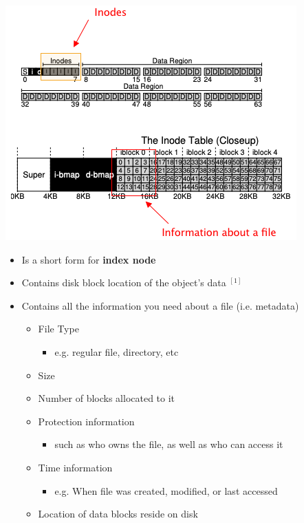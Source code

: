 \documentclass[12pt]{article}
\begin{document}
\begin{enumerate}[1.]
\begin{enumerate}[a)]
\begin{itemize}
            \begin{center}
            \includegraphics[width=\linewidth]{images/midterm_1_solution_12.png}
            \end{center}

            \begin{itemize}
                \item Is a short form for \textbf{index node}
                \item Contains disk block location of the object's data $^{[1]}$
                \item Contains all the information you need about a file (i.e. metadata)

                \begin{itemize}
                    \item File Type
                    \begin{itemize}
                        \item e.g. regular file, directory, etc
                    \end{itemize}
                    \item Size
                    \item Number of blocks allocated to it
                    \item Protection information
                    \begin{itemize}
                        \item such as who owns the file, as well as who can access it
                    \end{itemize}
                    \item Time information
                    \begin{itemize}
                        \item e.g. When file was created, modified, or last accessed
                    \end{itemize}
                    \item Location of data blocks reside on disk
                \end{itemize}
            \end{itemize}


\end{itemize}
\end{enumerate}
\end{enumerate}
\end{document}
